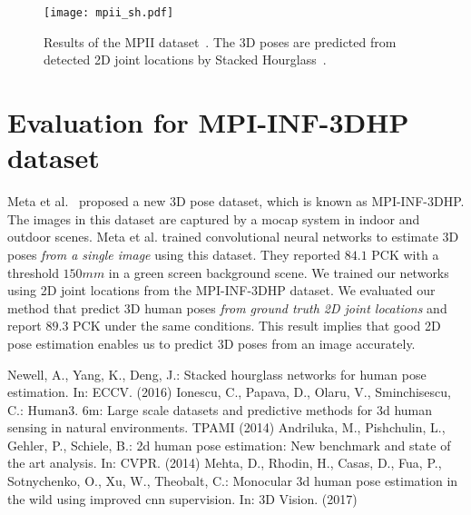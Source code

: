 \documentclass[runningheads]{llncs}
\begin{document}
\begin{figure}[tb]
  \begin{center}
    \texttt{[image: mpii\_sh.pdf]}
    \caption{
    Results of the MPII dataset~\cite{S_mpii}.
   	The 3D poses are predicted from detected 2D joint locations by Stacked Hourglass~\cite{S_newell}.
    }
    \label{mpii_sh}
  \end{center}
\end{figure}

\section{Evaluation for MPI-INF-3DHP dataset}
Meta et al.~\cite{S_mpi-inf} proposed a new 3D pose dataset, which is known as MPI-INF-3DHP.
The images in this dataset are captured by a mocap system in indoor and outdoor scenes.
Meta et al. trained convolutional neural networks to estimate 3D poses {\it from a single image} using this dataset.
They reported $84.1$ PCK with a threshold $150mm$ in a green screen background scene.
We trained our networks using 2D joint locations from the MPI-INF-3DHP dataset.
We evaluated our method that predict 3D human poses {\it from ground truth 2D joint locations} and report $89.3$ PCK under the same conditions.
This result implies that good 2D pose estimation enables us to predict 3D poses from an image accurately.

\begin{thebibliography}{11}
 Newell, A., Yang, K., Deng, J.: Stacked hourglass networks for human pose estimation. In: ECCV. (2016)
 Ionescu, C., Papava, D., Olaru, V., Sminchisescu, C.: Human3. 6m: Large scale datasets and predictive methods for 3d human sensing in natural environments. TPAMI (2014)
 Andriluka, M., Pishchulin, L., Gehler, P., Schiele, B.: 2d human pose estimation: New benchmark and state of the art analysis. In: CVPR. (2014)
 Mehta, D., Rhodin, H., Casas, D., Fua, P., Sotnychenko, O., Xu, W., Theobalt, C.: Monocular 3d human pose estimation in the wild using improved cnn supervision. In: 3D Vision. (2017)
\end{thebibliography}
\end{document}
